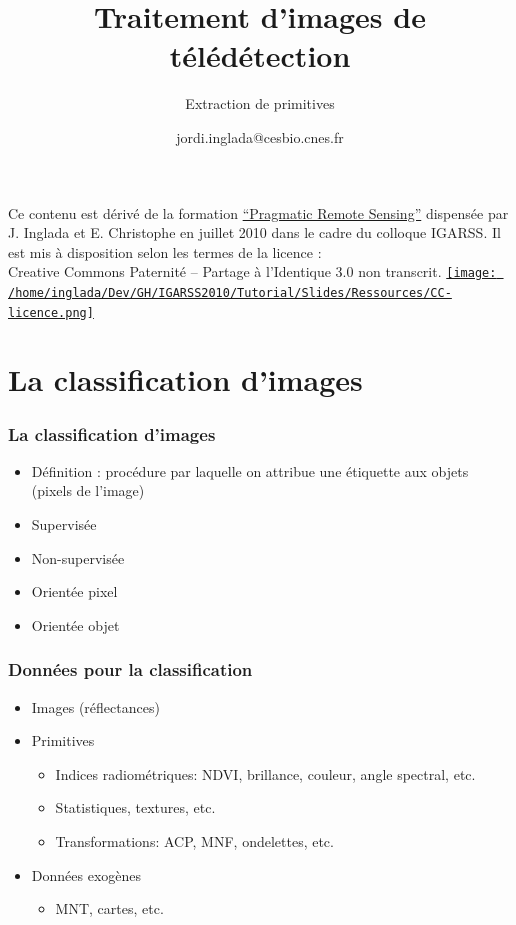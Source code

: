 \documentclass[compress]{beamer}
\title{Traitement d'images de télédétection}
\subtitle{Extraction de primitives}
\author
{jordi.inglada@cesbio.cnes.fr}
\institute[Cesbio] %
{\textsc{Centre d'Études Spatiales de la Biosphère, Toulouse, France}}
\date{}
\begin{document}
\begin{frame}
  \titlepage
  \begin{center}
{\tiny Ce contenu est dérivé de la formation \href{http://www.orfeo-toolbox.org/packages/PragmaticRemoteSensing-handout.pdf}{``Pragmatic Remote
  Sensing''} dispensée par J. Inglada et E. Christophe en juillet 2010
  dans le cadre du colloque IGARSS. Il est mis à disposition selon les termes de la licence :\\
Creative Commons Paternité – Partage à l’Identique 3.0 non transcrit.} \href{http://creativecommons.org/licenses/by-sa/3.0/}{\texttt{[image: /home/inglada/Dev/GH/IGARSS2010/Tutorial/Slides/Ressources/CC-licence.png]}}    
  \end{center}
\end{frame}


\section[Intro]{La classification d'images}
\begin{frame}
\frametitle{La classification d'images}
  \begin{itemize}
  \item Définition : procédure par laquelle on attribue une étiquette
    aux objets (pixels de l'image)
  \item Supervisée
  \item Non-supervisée
  \item Orientée pixel
  \item Orientée objet
  \end{itemize}
\end{frame}

\begin{frame}
  \frametitle{Données pour la classification}
  \begin{itemize}
  \item Images (réflectances)
  \item Primitives
    \begin{itemize}
    \item Indices radiométriques: NDVI, brillance, couleur, angle
      spectral, etc.
    \item Statistiques, textures, etc.
    \item Transformations: ACP, MNF, ondelettes, etc.
    \end{itemize}
  \item Données exogènes
    \begin{itemize}
    \item MNT, cartes, etc.
    \end{itemize}
  \end{itemize}
\end{frame}
\end{document}
